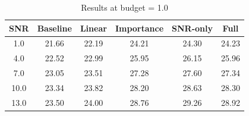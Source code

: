 \begin{table}[h]
\centering
\caption{Results at budget = 1.0}
\begin{tabular}{c|ccccc}
\hline
SNR & Baseline & Linear & Importance & SNR-only & Full \\
\hline
1.0 & 21.66 & 22.19 & 24.21 & 24.30 & 24.23 \\
4.0 & 22.52 & 22.99 & 25.95 & 26.15 & 25.96 \\
7.0 & 23.05 & 23.51 & 27.28 & 27.60 & 27.34 \\
10.0 & 23.34 & 23.82 & 28.20 & 28.63 & 28.30 \\
13.0 & 23.50 & 24.00 & 28.76 & 29.26 & 28.92 \\
\hline
\end{tabular}
\end{table}

